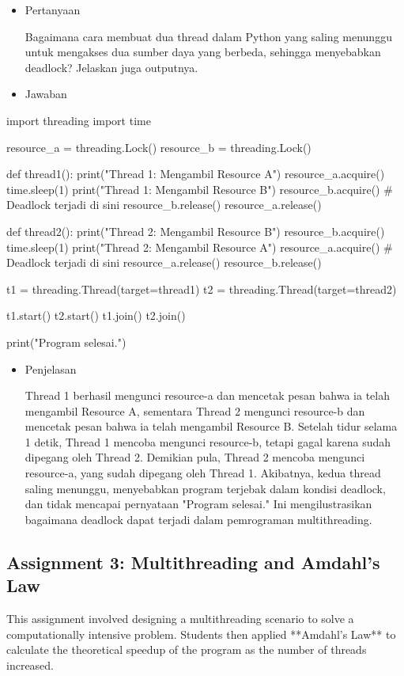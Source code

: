 \documentclass[12pt]{article}
\begin{document}
\begin{itemize}
    \item Pertanyaan
    
    Bagaimana cara membuat dua thread dalam Python yang saling menunggu untuk mengakses dua sumber daya yang berbeda, sehingga menyebabkan deadlock? Jelaskan juga outputnya.
\end{itemize}
\begin{itemize}
    \item Jawaban
\end{itemize}
\begin{python}
    import threading
import time

resource_a = threading.Lock()
resource_b = threading.Lock()

def thread1():
    print("Thread 1: Mengambil Resource A")
    resource_a.acquire()
    time.sleep(1)
    print("Thread 1: Mengambil Resource B")
    resource_b.acquire()  # Deadlock terjadi di sini
    resource_b.release()
    resource_a.release()

def thread2():
    print("Thread 2: Mengambil Resource B")
    resource_b.acquire()
    time.sleep(1) 
    print("Thread 2: Mengambil Resource A")
    resource_a.acquire()  # Deadlock terjadi di sini
    resource_a.release()
    resource_b.release()

t1 = threading.Thread(target=thread1)
t2 = threading.Thread(target=thread2)

t1.start()
t2.start()
t1.join()
t2.join()

print("Program selesai.")
\end{python}
\begin{itemize}
    \item Penjelasan

    Thread 1 berhasil mengunci resource-a dan mencetak pesan bahwa ia telah mengambil Resource A, sementara Thread 2 mengunci resource-b dan mencetak pesan bahwa ia telah mengambil Resource B. Setelah tidur selama 1 detik, Thread 1 mencoba mengunci resource-b, tetapi gagal karena sudah dipegang oleh Thread 2. Demikian pula, Thread 2 mencoba mengunci resource-a, yang sudah dipegang oleh Thread 1. Akibatnya, kedua thread saling menunggu, menyebabkan program terjebak dalam kondisi deadlock, dan tidak mencapai pernyataan "Program selesai." Ini mengilustrasikan bagaimana deadlock dapat terjadi dalam pemrograman multithreading.
\end{itemize}

\subsection{Assignment 3: Multithreading and Amdahl's Law}
This assignment involved designing a multithreading scenario to solve a computationally intensive problem. Students then applied **Amdahl's Law** to calculate the theoretical speedup of the program as the number of threads increased.
\end{document}
